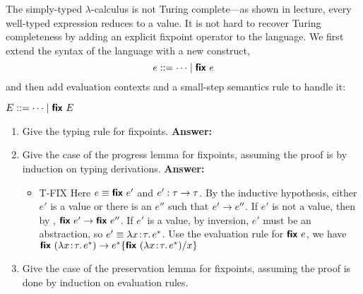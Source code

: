 \documentclass[11pt]{article}
\begin{document}
\begin{exercise}
The simply-typed $\lambda$-calculus is not Turing complete---as shown
in lecture, every well-typed expression reduces to a value. It is not
hard to recover Turing completeness by adding an explicit fixpoint
operator to the language. We first extend the syntax of the language
with a new construct,
\[
e ::= \dots \mid \textsf{\textbf{fix}}~e\\
\]
and then add evaluation contexts and a small-step semantics rule to
handle it:
\begin{center}
$E ::= \dots \mid \textsf{\textbf{fix}}~E$

\end{center}

\begin{enumerate}
\item Give the typing rule for fixpoints.
\newline
\newline
\textbf{Answer:}
\newline
\begin{center}
\end{center}
\item Give the case of the progress lemma for fixpoints, assuming the proof is by induction on typing derivations.
\newline
\newline
\textbf{Answer:}
	\begin{itemize}
		\item T-FIX \newline
		Here $e \equiv \typ{fix}\ e'$ and $e':\tau \rightarrow \tau$. By the inductive hypothesis, either $e'$ is a value
		or there is an $e''$ such that $e' \rightarrow e''$.
		\newline
		If $e'$ is not a value, then by , $\textsf{\textbf{fix}}\ e' \rightarrow \textsf{\textbf{fix}}\ e''$. If $e'$ is a
		value, by inversion, $e'$ must be an abstraction, so $e' \equiv \lambda x\!:\!\tau.\,e^{\ast}$. 
		Use the evaluation rule for $\textsf{\textbf{fix}}\ e$, we have $\textsf{\textbf{fix}}~(\lambda x\!:\!\tau.\,e^{\ast}) \rightarrow
		 e^{\ast}\{\textsf{\textbf{fix}}~(\lambda x\!:\!\tau.\,e^{\ast}) / x\}$
	\end{itemize}
\item Give the case of the preservation lemma for fixpoints, assuming the proof is done by induction on evaluation rules.
\newline

\end{enumerate}
\end{exercise}
\end{document}
